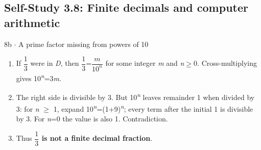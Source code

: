 \documentclass[11pt]{article}
\begin{document}
\begin{keepsection}\subsection{Self-Study 3.8: Finite decimals and computer arithmetic}

\begin{workedbox}{8b \ensuremath{\cdot} A prime factor missing from powers of 10}
\begin{enumerate}
\item If {\small\ensuremath{\dfrac{1}{3}}} were in \textit{D}, then {\small\ensuremath{\dfrac{1}{3}}}={\small\ensuremath{\dfrac{{m}}{10^{{n}}}}} for some integer \textit{m} and \textit{n}\ensuremath{\geq}0. Cross-multiplying gives 10\textsuperscript{\textit{n}}=3\textit{m}.
\item The right side is divisible by 3. But 10\textsuperscript{\textit{n}} leaves remainder 1 when divided by 3: for \textit{n} \ensuremath{\geq} 1, expand 10\textsuperscript{\textit{n}}=(1+9)\textsuperscript{\textit{n}}; every term after the initial 1 is divisible by 3. For \textit{n}=0 the value is also 1. Contradiction.
\item Thus \textbf{{\small\ensuremath{\dfrac{1}{3}}} is not a finite decimal fraction}.
\end{enumerate}
\end{workedbox}

\end{keepsection}
\end{document}
